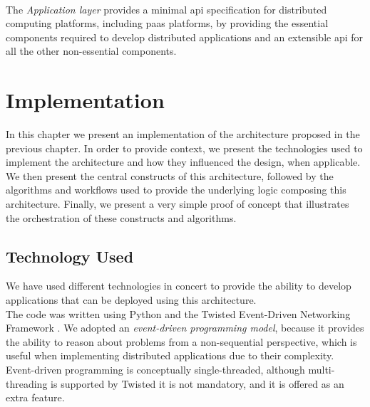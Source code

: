 \documentclass[12pt, titlepage]{uo_temp}
\begin{document}
     \\ The \emph{Application layer} provides a minimal \gls{api} specification for
     distributed computing platforms, including \gls{paas} platforms, by providing the
     essential components required to develop distributed applications and an
     extensible \gls{api} for all the other non-essential components.

     \chapter{Implementation}\label{implementation_chap}
     In this chapter we present an implementation of the architecture proposed in the
     previous chapter. In order to provide context, we present the technologies used to
     implement the architecture and how they influenced the design, when applicable. We
     then present the central constructs of this architecture, followed by the algorithms
     and workflows used to provide the underlying logic composing this
     architecture. Finally, we present a very simple proof of concept that illustrates the
     orchestration of these constructs and algorithms.


     \section{Technology Used}
     We have used different technologies in concert to provide the ability to develop
     applications that can be deployed using this architecture.\\

     The code was written using Python and the Twisted Event-Driven Networking Framework
     \cite{twisted}. We adopted an \emph{event-driven programming model}, because it
     provides the ability to reason about problems from a non-sequential perspective,
     which is useful when implementing distributed applications due to their
     complexity. Event-driven programming is conceptually single-threaded, although
     multi-threading is supported by Twisted it is not mandatory, and it is offered as an
     extra feature.
\end{document}
